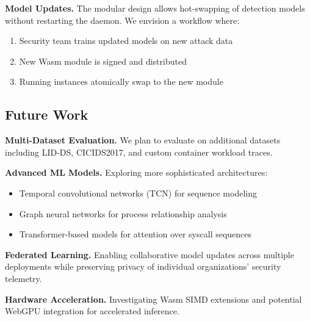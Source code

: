 \textbf{Model Updates.}
The modular design allows hot-swapping of detection models without restarting the daemon.
We envision a workflow where:
\begin{enumerate}
    \item Security team trains updated models on new attack data
    \item New Wasm module is signed and distributed
    \item Running instances atomically swap to the new module
\end{enumerate}

\subsection{Future Work}

\textbf{Multi-Dataset Evaluation.}
We plan to evaluate on additional datasets including LID-DS, CICIDS2017, and custom container workload traces.

\textbf{Advanced ML Models.}
Exploring more sophisticated architectures:
\begin{itemize}
    \item Temporal convolutional networks (TCN) for sequence modeling
    \item Graph neural networks for process relationship analysis
    \item Transformer-based models for attention over syscall sequences
\end{itemize}

\textbf{Federated Learning.}
Enabling collaborative model updates across multiple deployments while preserving privacy of individual organizations' security telemetry.

\textbf{Hardware Acceleration.}
Investigating Wasm SIMD extensions and potential WebGPU integration for accelerated inference.
